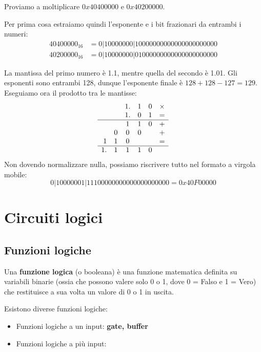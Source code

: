 \documentclass[11pt, a4paper, titlepage, oneside]{scrbook}
\begin{document}
Proviamo a moltiplicare $0x40400000$ e $0x40200000$.

Per prima cosa estraiamo quindi l'esponente e i bit frazionari da entrambi i numeri:
\begin{align*}
40400000_{16} &= 0|10000000|10000000000000000000000 \\
40200000_{16} &= 0|10000000|01000000000000000000000
\end{align*}

La mantissa del primo numero è 1.1, mentre quella del secondo è 1.01. Gli esponenti sono entrambi 128, dunque l'esponente finale è $128+128-127 = 129$. Eseguiamo ora il prodotto tra le mantisse:
\[
\begin{array}{rccccc}
& & 1. & 1 & 0 & \times \\
& & 1. & 0 & 1 & = \\
\hline
& & 1 & 1 & 0 & + \\
& 0 & 0 & 0 & & + \\
1 & 1 & 0 & & & = \\
\hline
1. & 1 & 1 & 1 & 0
\end{array}
\]
Non dovendo normalizzare nulla, possiamo riscrivere tutto nel formato a virgola mobile:
\[
0|10000001|11100000000000000000000 = 0x40F00000
\]

\chapter{Circuiti logici}

\section{Funzioni logiche}

\begin{Definizione}
\label{def-funzione-logica}
Una \textbf{funzione logica} (o booleana) è una funzione matematica definita su variabili binarie (ossia che possono valere solo 0 o 1, dove 0 = Falso e 1 = Vero) che restituisce a sua volta un valore di 0 o 1 in uscita.
\end{Definizione}

Esistono diverse funzioni logiche:
\begin{itemize}
    \item Funzioni logiche a un input:  \textbf{gate, buffer}
    \item Funzioni logiche a più input: 
\end{itemize}
\end{document}

